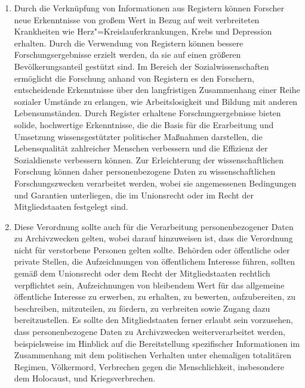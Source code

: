 \begin{enumerate}

   \item Durch die Verknüpfung von Informationen aus Registern können Forscher neue Erkenntnisse von großem Wert in
    Bezug auf weit verbreiteten Krankheiten wie Herz"=Kreislauferkrankungen, Krebs und Depression erhalten. Durch die
    Verwendung von Registern können bessere Forschungsergebnisse erzielt werden, da sie auf einen größeren
    Bevölkerungsanteil gestützt sind. Im Bereich der Sozialwissenschaften ermöglicht die Forschung anhand von Registern
    es den Forschern, entscheidende Erkenntnisse über den langfristigen Zusammenhang einer Reihe sozialer Umstände zu
    erlangen, wie Arbeitslosigkeit und Bildung mit anderen Lebensumständen. Durch Register erhaltene
    Forschungsergebnisse bieten solide, hochwertige Erkenntnisse, die die Basis für die Erarbeitung und Umsetzung
    wissensgestützter politischer Maßnahmen darstellen, die Lebensqualität zahlreicher Menschen verbessern und die
    Effizienz der Sozialdienste verbessern können. Zur Erleichterung der wissenschaftlichen Forschung können daher
    personenbezogene Daten zu wissenschaftlichen Forschungszwecken verarbeitet werden, wobei sie angemessenen
    Bedingungen und Garantien unterliegen, die im Unionsrecht oder im Recht der Mitgliedstaaten festgelegt sind.%
   \label{itm:eg-157}
   

   \item Diese Verordnung sollte auch für die Verarbeitung personenbezogener Daten zu Archivzwecken gelten, wobei darauf
    hinzuweisen ist, dass die Verordnung nicht für verstorbene Personen gelten sollte. Behörden oder öffentliche oder
    private Stellen, die Aufzeichnungen von öffentlichem Interesse führen, sollten gemäß dem Unionsrecht oder dem Recht
    der Mitgliedstaaten rechtlich verpflichtet sein, Aufzeichnungen von bleibendem Wert für das allgemeine öffentliche
    Interesse zu erwerben, zu erhalten, zu bewerten, aufzubereiten, zu beschreiben, mitzuteilen, zu fördern, zu
    verbreiten sowie Zugang dazu bereitzustellen. Es sollte den Mitgliedstaaten ferner erlaubt sein vorzusehen, dass
    personenbezogene Daten zu Archivzwecken weiterverarbeitet werden, beispielsweise im Hinblick auf die Bereitstellung
    spezifischer Informationen im Zusammenhang mit dem politischen Verhalten unter ehemaligen totalitären Regimen,
    Völkermord, Verbrechen gegen die Menschlichkeit, insbesondere dem Holocaust, und Kriegsverbrechen.%
   \label{itm:eg-158}
   

\end{enumerate}

